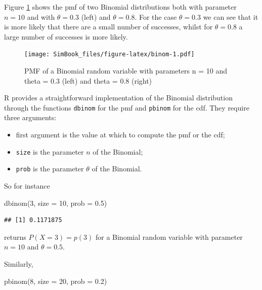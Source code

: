 \documentclass[
]{book}
\newenvironment{Shaded}{\begin{snugshade}}{\end{snugshade}}
\newcommand{\AttributeTok}[1]{\textcolor[rgb]{0.77,0.63,0.00}{#1}}
\newcommand{\DecValTok}[1]{\textcolor[rgb]{0.00,0.00,0.81}{#1}}
\newcommand{\FloatTok}[1]{\textcolor[rgb]{0.00,0.00,0.81}{#1}}
\newcommand{\FunctionTok}[1]{\textcolor[rgb]{0.00,0.00,0.00}{#1}}
\newcommand{\NormalTok}[1]{#1}
\begin{document}
Figure \ref{fig:binom} shows the pmf of two Binomial distributions both with parameter \(n=10\) and with \(\theta=0.3\) (left) and \(\theta=0.8\). For the case \(\theta=0.3\) we can see that it is more likely that there are a small number of successes, whilst for \(\theta=0.8\) a large number of successes is more likely.

\begin{figure}
\centering
\texttt{[image: SimBook\_files/figure-latex/binom-1.pdf]}
\caption{\label{fig:binom}PMF of a Binomial random variable with parameters n = 10 and theta = 0.3 (left) and theta = 0.8 (right)}
\end{figure}

R provides a straightforward implementation of the Binomial distribution through the functions \texttt{dbinom} for the pmf and \texttt{pbinom} for the cdf. They require three arguments:

\begin{itemize}
\item
  first argument is the value at which to compute the pmf or the cdf;
\item
  \texttt{size} is the parameter \(n\) of the Binomial;
\item
  \texttt{prob} is the parameter \(\theta\) of the Binomial.
\end{itemize}

So for instance

\begin{Shaded}
\begin{Highlighting}[]
\FunctionTok{dbinom}\NormalTok{(}\DecValTok{3}\NormalTok{, }\AttributeTok{size =} \DecValTok{10}\NormalTok{, }\AttributeTok{prob =} \FloatTok{0.5}\NormalTok{)}
\end{Highlighting}
\end{Shaded}

\begin{verbatim}
## [1] 0.1171875
\end{verbatim}

returns \(P(X=3)=p(3)\) for a Binomial random variable with parameter \(n=10\) and \(\theta = 0.5\).

Similarly,

\begin{Shaded}
\begin{Highlighting}[]
\FunctionTok{pbinom}\NormalTok{(}\DecValTok{8}\NormalTok{, }\AttributeTok{size =} \DecValTok{20}\NormalTok{, }\AttributeTok{prob =} \FloatTok{0.2}\NormalTok{)}
\end{Highlighting}
\end{Shaded}
\end{document}
